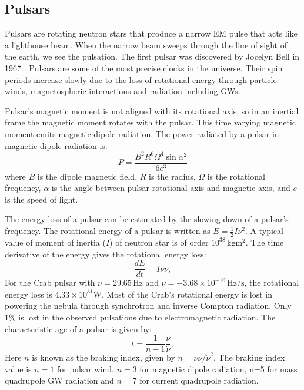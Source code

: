 \documentclass{ttuthes2007}
\begin{document}
\subsection{Pulsars}
Pulsars are rotating neutron stars that produce a narrow \ac{EM} pulse that
acts like a lighthouse beam. When the narrow beam sweeps through the line of sight of
the earth, we see the pulsation. The first pulsar was discovered by Jocelyn Bell in 1967
. Pulsars are some of the most precise clocks in the
universe. Their spin periods increase slowly due to the loss of rotational
energy through particle winds, magnetospheric interactions and radiation
including \acp{GW}.

Pulsar's magnetic moment is not aligned with its rotational axis, so in an
inertial frame
the magnetic moment rotates with the pulsar. This time varying magnetic
moment emits magnetic dipole radiation. The power radiated by
a pulsar in magnetic dipole radiation is:
\begin{equation}
P= \frac{B^2R^6\Omega^4\sin{\alpha}^2}{6c^3}
\end{equation}
where $B$ is the dipole magnetic field, $R$ is the radius, $\Omega$ is the rotational
frequency, $\alpha$ is the angle between pulsar rotational axis and magnetic axis,
and $c$ is the speed of light.  

The energy loss of a pulsar can be estimated by the slowing down of a pulsar's
frequency. The rotational energy of a pulsar is written as $E=\frac{1}{2} I
\nu^2$. A
typical value of moment of inertia ($I$) of neutron star is of order
$10^{38}$\,$\mathrm{kg m^2}$. The
time derivative of the energy gives the rotational energy loss:
\begin{equation}
\frac{dE}{dt}= I\nu\dot{\nu},
\end{equation}
For the Crab pulsar with $\nu=29.65\,\mathrm{Hz}$ and $\dot{\nu}=
-3.68\times10^{-10}\,\mathrm{Hz/s}$, the
rotational energy loss is $4.33\times10^{31}\mathrm{W}$. Most of the Crab's rotational energy
is lost in powering the nebula through synchrotron and inverse Compton radiation.
Only $1\%$ is lost in the observed pulsations due to electromagnetic radiation.
The characteristic age of a pulsar is given by:
\begin{equation}
t= \frac{1}{n-1}\frac{\nu}{\dot{\nu}},
\end{equation} 
Here $n$ is known as the braking index, given by $n=\nu\ddot{\nu}/\dot{\nu}^2$. 
The braking index value is $n=1$ for pulsar wind, $n=3$ for magnetic dipole
radiation, n=5 for mass quadrupole \ac{GW} radiation and $n=7$ for current
quadrupole radiation.
\end{document}
